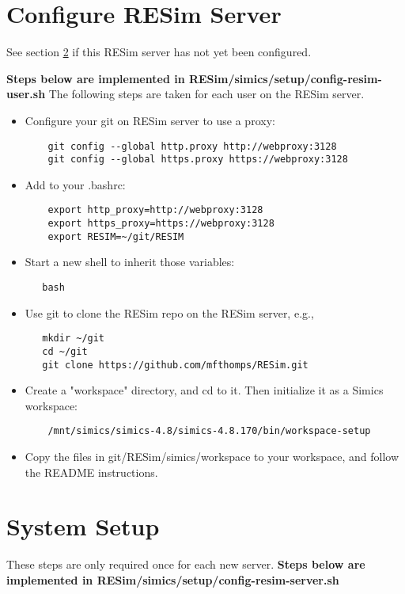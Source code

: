 \documentclass[titlepage]{article}
\begin{document}
\section{Configure RESim Server}
See section \ref{section-system} if this RESim server has not yet been configured.

\textbf{Steps below are implemented in RESim/simics/setup/config-resim-user.sh}
The following steps are taken for each user on the RESim server.
\begin{itemize}
\item Configure your git on RESim server to use a proxy:
\begin{verbatim}
    git config --global http.proxy http://webproxy:3128
    git config --global https.proxy https://webproxy:3128
\end{verbatim}

\item Add to your .bashrc:
\begin{verbatim}
    export http_proxy=http://webproxy:3128
    export https_proxy=https://webproxy:3128
    export RESIM=~/git/RESIM
\end{verbatim}
\item Start a new shell to inherit those variables:
\begin{verbatim}
   bash
\end{verbatim}

\item Use git to clone the RESim repo on the RESim server, e.g., 
\begin{verbatim}
   mkdir ~/git
   cd ~/git
   git clone https://github.com/mfthomps/RESim.git
\end{verbatim}

\item Create a "workspace" directory, and cd to it.  Then initialize
it as a Simics workspace:
\begin{verbatim}
    /mnt/simics/simics-4.8/simics-4.8.170/bin/workspace-setup
\end{verbatim}


\item Copy the files in git/RESim/simics/workspace to your workspace, and follow the README instructions.
\end{itemize}



\section{System Setup} 
\label{section-system}
These steps are only required once for each new server.
\textbf{Steps below are implemented in RESim/simics/setup/config-resim-server.sh}
\end{document}
